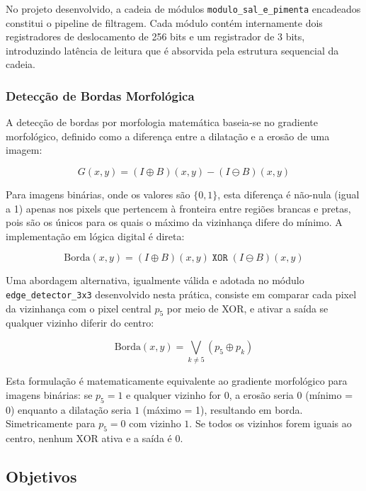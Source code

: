 \documentclass[12pt, a4paper]{article}
\begin{document}
	No projeto desenvolvido, a cadeia de módulos \texttt{modulo\_sal\_e\_pimenta}
	encadeados constitui o pipeline de filtragem. Cada módulo contém internamente
	dois registradores de deslocamento de 256 bits e um registrador de 3 bits,
	introduzindo latência de leitura que é absorvida pela estrutura sequencial da
	cadeia.
	
	\subsubsection{Detecção de Bordas Morfológica}
	
	A detecção de bordas por morfologia matemática baseia-se no gradiente morfológico,
	definido como a diferença entre a dilatação e a erosão de uma imagem:
	
	\begin{equation}
		G(x,y) = (I \oplus B)(x,y) - (I \ominus B)(x,y)
		\label{eq:gradiente}
	\end{equation}
	
	Para imagens binárias, onde os valores são $\{0,1\}$, esta diferença é não-nula
	(igual a 1) apenas nos pixels que pertencem à fronteira entre regiões brancas e
	pretas, pois são os únicos para os quais o máximo da vizinhança difere do mínimo.
	A implementação em lógica digital é direta:
	
	\begin{equation}
		\text{Borda}(x,y) = (I \oplus B)(x,y) \;\mathtt{XOR}\; (I \ominus B)(x,y)
		\label{eq:borda_xor}
	\end{equation}
	
	Uma abordagem alternativa, igualmente válida e adotada no módulo
	\texttt{edge\_detector\_3x3} desenvolvido nesta prática, consiste em comparar
	cada pixel da vizinhança com o pixel central $p_5$ por meio de XOR, e ativar a
	saída se qualquer vizinho diferir do centro:
	
	\begin{equation}
		\text{Borda}(x,y) = \bigvee_{k \neq 5} (p_5 \oplus p_k)
		\label{eq:borda_xor_central}
	\end{equation}
	
	Esta formulação é matematicamente equivalente ao gradiente morfológico para
	imagens binárias: se $p_5 = 1$ e qualquer vizinho for $0$, a erosão seria $0$
	(mínimo = 0) enquanto a dilatação seria $1$ (máximo = 1), resultando em borda.
	Simetricamente para $p_5 = 0$ com vizinho $1$. Se todos os vizinhos forem iguais
	ao centro, nenhum XOR ativa e a saída é $0$.
	
	\subsection{Objetivos}
	
\end{document}
